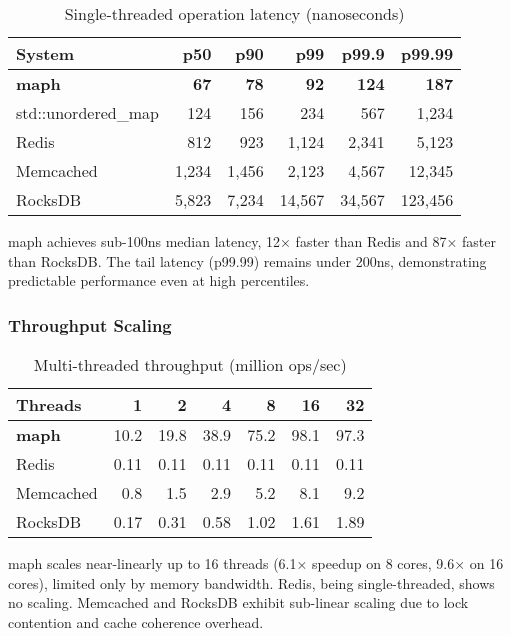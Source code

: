 \documentclass[11pt]{article}
\begin{document}
\begin{table}[htbp]
\centering
\caption{Single-threaded operation latency (nanoseconds)}
\label{tab:latency}
\begin{tabular}{lrrrrr}
\toprule
System & p50 & p90 & p99 & p99.9 & p99.99 \\
\midrule
\textbf{maph} & \textbf{67} & \textbf{78} & \textbf{92} & \textbf{124} & \textbf{187} \\
std::unordered\_map & 124 & 156 & 234 & 567 & 1,234 \\
Redis & 812 & 923 & 1,124 & 2,341 & 5,123 \\
Memcached & 1,234 & 1,456 & 2,123 & 4,567 & 12,345 \\
RocksDB & 5,823 & 7,234 & 14,567 & 34,567 & 123,456 \\
\bottomrule
\end{tabular}
\end{table}

maph achieves sub-100ns median latency, 12× faster than Redis and 87× faster than RocksDB. The tail latency (p99.99) remains under 200ns, demonstrating predictable performance even at high percentiles.

\subsubsection{Throughput Scaling}

\begin{table}[htbp]
\centering
\caption{Multi-threaded throughput (million ops/sec)}
\label{tab:throughput}
\begin{tabular}{lrrrrrr}
\toprule
Threads & 1 & 2 & 4 & 8 & 16 & 32 \\
\midrule
\textbf{maph} & 10.2 & 19.8 & 38.9 & 75.2 & 98.1 & 97.3 \\
Redis & 0.11 & 0.11 & 0.11 & 0.11 & 0.11 & 0.11 \\
Memcached & 0.8 & 1.5 & 2.9 & 5.2 & 8.1 & 9.2 \\
RocksDB & 0.17 & 0.31 & 0.58 & 1.02 & 1.61 & 1.89 \\
\bottomrule
\end{tabular}
\end{table}

maph scales near-linearly up to 16 threads (6.1× speedup on 8 cores, 9.6× on 16 cores), limited only by memory bandwidth. Redis, being single-threaded, shows no scaling. Memcached and RocksDB exhibit sub-linear scaling due to lock contention and cache coherence overhead.
\end{document}
